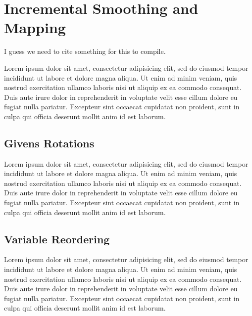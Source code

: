 \documentclass[conference]{IEEEtran}
\begin{document}
\section{Incremental Smoothing and Mapping}
\label{sec:incrementalsmoothingandmapping}


I guess we need to cite something for this to compile. \cite{Kaess08tro}

Lorem ipsum dolor sit amet, consectetur adipisicing elit, sed do eiusmod tempor incididunt
ut labore et dolore magna aliqua. Ut enim ad minim veniam, quis nostrud exercitation
ullamco laboris nisi ut aliquip ex ea commodo consequat. Duis aute irure dolor in
reprehenderit in voluptate velit esse cillum dolore eu fugiat nulla pariatur. Excepteur
sint occaecat cupidatat non proident, sunt in culpa qui officia deserunt mollit anim id
est laborum.


\subsection*{Givens Rotations}
\label{sub:givensrotations}

Lorem ipsum dolor sit amet, consectetur adipisicing elit, sed do eiusmod tempor incididunt
ut labore et dolore magna aliqua. Ut enim ad minim veniam, quis nostrud exercitation
ullamco laboris nisi ut aliquip ex ea commodo consequat. Duis aute irure dolor in
reprehenderit in voluptate velit esse cillum dolore eu fugiat nulla pariatur. Excepteur
sint occaecat cupidatat non proident, sunt in culpa qui officia deserunt mollit anim id
est laborum.


\subsection*{Variable Reordering}
\label{sub:variablereordering}

Lorem ipsum dolor sit amet, consectetur adipisicing elit, sed do eiusmod tempor incididunt
ut labore et dolore magna aliqua. Ut enim ad minim veniam, quis nostrud exercitation
ullamco laboris nisi ut aliquip ex ea commodo consequat. Duis aute irure dolor in
reprehenderit in voluptate velit esse cillum dolore eu fugiat nulla pariatur. Excepteur
sint occaecat cupidatat non proident, sunt in culpa qui officia deserunt mollit anim id
est laborum.
\end{document}
